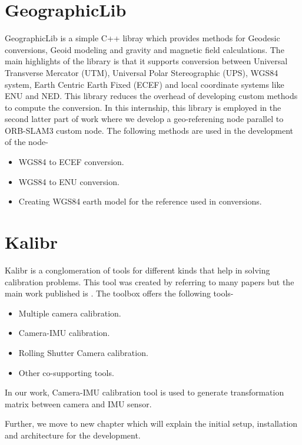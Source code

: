\section{GeographicLib}
\label{sec:techbg:geographiclib}
GeographicLib \cite{GeographicLib} is a simple C++ libray which provides methods for Geodesic conversions, Geoid modeling and gravity and magnetic field calculations. The main highlights of the library is that it supports conversion between Universal Transverse Mercator (UTM), Universal Polar Stereographic (UPS), WGS84 system, Earth Centric Earth Fixed (ECEF) and local coordinate systems like ENU and NED. This library reduces the overhead of developing custom methods to compute the conversion. In this internship, this library is employed in the second latter part of work where we develop a geo-referening node parallel to ORB-SLAM3 custom node. The following methods are used in the development of the node-
\begin{itemize}
    \item WGS84 to ECEF conversion.
    \item WGS84 to ENU conversion.
    \item Creating WGS84 earth model for the reference used in conversions. 
\end{itemize}

\section{Kalibr}
\label{sec:techbg:kalibr}
Kalibr \cite{Kalibr} is a conglomeration of tools for different kinds that help in solving calibration problems. This tool was created by referring to many papers but the main work published is \cite{7487628}. The toolbox offers the following tools-
\begin{itemize}
    \item Multiple camera calibration.
    \item Camera-IMU calibration.
    \item Rolling Shutter Camera calibration.
    \item Other co-supporting tools.
\end{itemize}

In our work, Camera-IMU calibration tool \cite{6696514}\cite{6225005} is used to generate transformation matrix between camera and IMU sensor. 

\vspace{1cm}
Further, we move to new chapter which will explain the initial setup, installation and architecture for the development.   